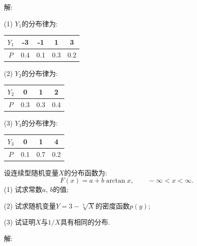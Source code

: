 \documentclass[standard]{ExBook}
\begin{document}
\begin{qitems}
\vspace{-5em}

    \begin{bbox}
解: 

(1) $Y_1$的分布律为:
\begin{center}
\setlength{\tabcolsep}{14pt}
\begin{tabular}{c|cccc}
$Y_1$ & -3 & -1 & 1 & 3\\
\hline
$P$ & 0.4 & 0.1 & 0.3 & 0.2\\
\end{tabular}
\end{center}

(2) $Y_2$的分布律为:
\begin{center}
\setlength{\tabcolsep}{14pt}
\begin{tabular}{c|ccc}
$Y_2$ & 0 & 1 & 2\\
\hline
$P$ & 0.3 & 0.3 & 0.4\\
\end{tabular}
\end{center}

(3) $Y_3$的分布律为:
\begin{center}
\setlength{\tabcolsep}{14pt}
\begin{tabular}{c|ccc}
$Y_3$ & 0 & 1 & 4\\
\hline
$P$ & 0.1 & 0.7 & 0.2\\
\end{tabular}
\end{center}
    \end{bbox}

\vspace{-5em}

    \begin{bbox}
    \begin{shaded}
        \qitem
设连续型随机变量$X$的分布函数为:
$$F(x)=a+b\arctan x,\qquad -\infty < x < \infty.$$
(1) 试求常数$a$, $b$的值;

(2) 试求随机变量$Y=3-\sqrt[3]{X}$的密度函数$p(y)$;

(3) 试证明$X$与$1/X$具有相同的分布.
    \end{shaded}
    \end{bbox}

\vspace{-5em}

    \begin{bbox}
解: 


\end{bbox}
\end{qitems}
\end{document}
